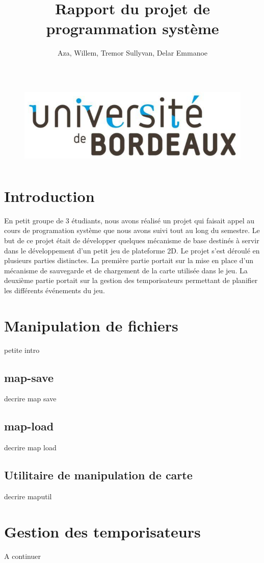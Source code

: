 \documentclass{article}
\title{\textbf{Rapport du projet de programmation système}}
\author{Aza, Willem, Tremor Sullyvan, Delar Emmanoe}
\begin{document}
\maketitle
\thispagestyle{fancy}

\begin{figure}[!b]
		\centering
		\includegraphics[height=4cm]{logo.jpg}
	\end{figure}

\newpage
\tableofcontents

\newpage
\section{Introduction}
En petit groupe de 3 \'etudiants, nous avons r\'ealis\'e un projet qui faisait appel au cours de programation syst\`eme que nous avons suivi tout au long du semestre. Le but de ce projet \'etait de d\'evelopper quelques m\'ecanisme de base destin\'es \`a servir dans le d\'eveloppement d'un petit jeu de plateforme 2D. Le projet s'est d\'eroul\'e en plusieurs parties distinctes. La premi\`ere partie portait sur la mise en place d’un m\'ecanisme de sauvegarde et de chargement de la carte utilis\'ee dans le jeu. La deuxième partie portait sur la gestion des temporisateurs permettant de planifier les diff\'erents \'ev\'enements du jeu.

\section{Manipulation de fichiers}
petite intro
	\subsection{map-save}
	decrire map save
	\subsection{map-load}
	decrire map load
	\subsection{Utilitaire de manipulation de carte}
	decrire maputil


\section{Gestion des temporisateurs}
A continuer
\end{document}
